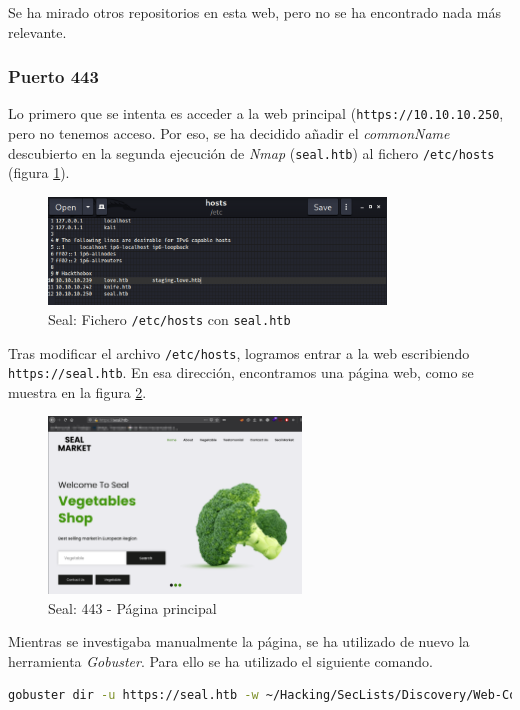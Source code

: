 Se ha mirado otros repositorios en esta web, pero no se ha encontrado nada más relevante.

\subsubsection{Puerto 443}

Lo primero que se intenta es acceder a la web principal (\texttt{https://10.10.10.250}, pero no tenemos acceso. Por eso, se ha decidido añadir el \textit{commonName} descubierto en la segunda ejecución de \textit{Nmap} (\texttt{seal.htb}) al fichero \texttt{/etc/hosts} (figura \ref{fig:seal-etc-hosts}).

\begin{figure}[h]
    \centering
    \includegraphics[width=0.80\textwidth]{images/machines/seal/etc-hosts.png}
    \caption{Seal: Fichero \texttt{/etc/hosts} con \texttt{seal.htb}}
    \label{fig:seal-etc-hosts}
\end{figure}

Tras modificar el archivo \texttt{/etc/hosts}, logramos entrar a la web escribiendo \texttt{\\https://seal.htb}. En esa dirección, encontramos una página web, como se muestra en la figura \ref{fig:seal-443-main}.

\begin{figure}[h]
    \centering
    \includegraphics[width=0.60\textwidth]{images/machines/seal/seal-main.png}
    \caption{Seal: 443 - Página principal}
    \label{fig:seal-443-main}
\end{figure}

Mientras se investigaba manualmente la página, se ha utilizado de nuevo la herramienta \textit{Gobuster}\cite{gobuster}. Para ello se ha utilizado el siguiente comando.
\begin{lstlisting}[language=bash]
gobuster dir -u https://seal.htb -w ~/Hacking/SecLists/Discovery/Web-Content/tomcat.txt -k | anew 03_gobuster_433.txt
\end{lstlisting}

